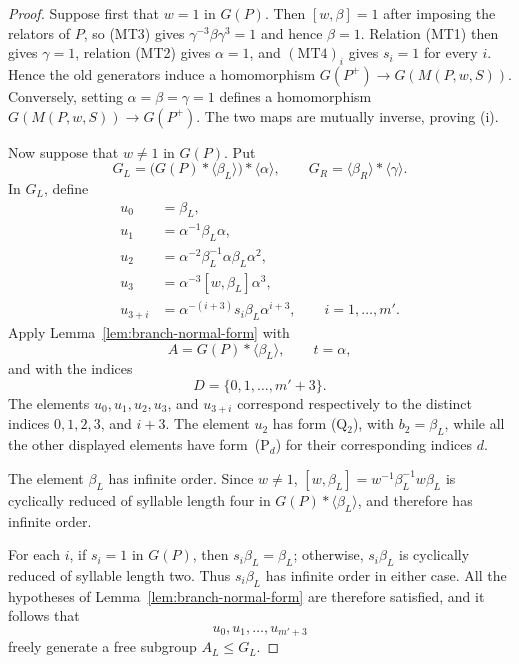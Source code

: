 \documentclass[a4paper,11pt,reqno]{amsart}
\theoremstyle{definition}
\theoremstyle{remark}
\begin{document}
	\begin{proof}
		Suppose first that $w=1$ in $G(P)$. Then
		$[w,\beta]=1$ after imposing the relators of $P$, so (MT3) gives
		$\gamma^{-3}\beta\gamma^3=1$ and hence $\beta=1$. Relation (MT1)
		then gives $\gamma=1$, relation (MT2) gives $\alpha=1$, and
		$(\mathrm{MT4})_i$ gives $s_i=1$ for every $i$. Hence the old
		generators induce a homomorphism $G(P^+)\to G(M(P,w,S))$. Conversely,
		setting $\alpha=\beta=\gamma=1$ defines a homomorphism
		$G(M(P,w,S))\to G(P^+)$. The two maps are mutually inverse, proving (i).
		
		Now suppose that $w\ne1$ in $G(P)$. Put
		\[
		G_L=\bigl(G(P)*\langle\beta_L\rangle\bigr)*\langle\alpha\rangle,
		\qquad
		G_R=\langle\beta_R\rangle*\langle\gamma\rangle .
		\]
		In $G_L$, define
		\[
		\begin{aligned}
			u_0&=\beta_L,\\
			u_1&=\alpha^{-1}\beta_L\alpha,\\
			u_2&=\alpha^{-2}\beta_L^{-1}\alpha\beta_L\alpha^2,\\
			u_3&=\alpha^{-3}[w,\beta_L]\alpha^3,\\
			u_{3+i}&=\alpha^{-(i+3)}s_i\beta_L\alpha^{i+3},
			\qquad i=1,\dots,m'.
		\end{aligned}
		\]
		Apply Lemma~\ref{lem:branch-normal-form} with
		\[
		A=G(P)*\langle\beta_L\rangle,\qquad t=\alpha,
		\]
		and with the indices
		\[
		D=\{0,1,\ldots,m'+3\}.
		\]
		The elements $u_0,u_1,u_2,u_3$, and $u_{3+i}$ correspond respectively to the distinct indices $0,1,2,3$, and $i+3$. The element $u_2$ has form (Q$_2$), with $b_2=\beta_L$, while all the other displayed elements have form~(P$_d$) for their corresponding indices $d$.
		
		The element $\beta_L$ has infinite order. Since $w\ne1$, $[w,\beta_L]=w^{-1}\beta_L^{-1}w\beta_L$
		is cyclically reduced of syllable length four in
		$G(P)*\langle\beta_L\rangle$,
		and therefore has infinite order. 
		
		For each $i$, if $s_i=1$ in $G(P)$, then $s_i\beta_L=\beta_L$; otherwise, $s_i\beta_L$ is cyclically reduced of syllable length two. Thus $s_i\beta_L$ has infinite order in either case. All the hypotheses of Lemma~\ref{lem:branch-normal-form} are therefore satisfied, and it follows that
		\[
		u_0,u_1,\ldots,u_{m'+3}
		\]
		freely generate a free subgroup $A_L\le G_L$.
		

\end{proof}
\end{document}
